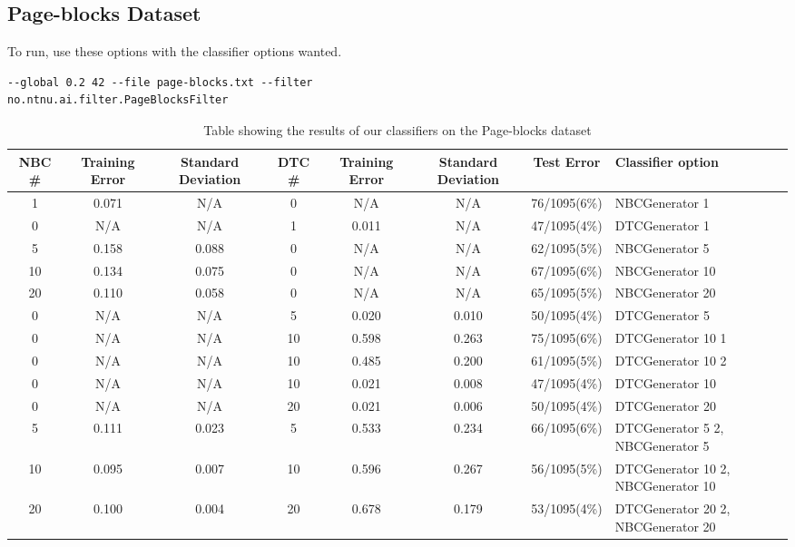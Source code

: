 \subsection{Page-blocks Dataset}\label{pblocks}


To run, use these options with the classifier options wanted.

\begin{lstlisting}[label=lst:pblocks, caption=Page-blocks dataset general 
options]
--global 0.2 42 --file page-blocks.txt --filter 
no.ntnu.ai.filter.PageBlocksFilter
\end{lstlisting}

\begin{landscape}
\begin{table}
\begin{tabular}{|c|c|c||c|c|c||c||p{5cm}|}
\hline
NBC \# & Training Error & Standard Deviation & DTC \# & Training Error
& Standard Deviation & Test Error & Classifier option \\ \hline
1 & 0.071 & N/A & 0 & N/A & N/A & 76/1095(6\%) & NBCGenerator 1 \\ \hline
0 & N/A & N/A & 1 & 0.011 & N/A & 47/1095(4\%) & DTCGenerator 1 \\ \hline
5 & 0.158 & 0.088 & 0 & N/A & N/A & 62/1095(5\%) & NBCGenerator 5 \\ \hline
10 & 0.134 & 0.075 & 0 & N/A & N/A & 67/1095(6\%) & NBCGenerator 10 \\ \hline
20 & 0.110 & 0.058 & 0 & N/A & N/A & 65/1095(5\%) & NBCGenerator 20 \\ \hline
0 & N/A & N/A & 5 & 0.020 & 0.010 & 50/1095(4\%) & DTCGenerator 5 \\ \hline
0 & N/A & N/A & 10 & 0.598 & 0.263 & 75/1095(6\%) & DTCGenerator 10 1 \\ \hline
0 & N/A & N/A & 10 & 0.485 & 0.200 & 61/1095(5\%) & DTCGenerator 10 2 \\ \hline
0 & N/A & N/A & 10 & 0.021 & 0.008 & 47/1095(4\%) & DTCGenerator 10 \\ \hline
0 & N/A & N/A & 20 & 0.021 & 0.006 & 50/1095(4\%) & DTCGenerator 20 \\ \hline
5 & 0.111 & 0.023 & 5 & 0.533 & 0.234 & 66/1095(6\%) & DTCGenerator 5 2, 
\newline NBCGenerator 5 \\ \hline
10 & 0.095 & 0.007 & 10 & 0.596 & 0.267 & 56/1095(5\%) & DTCGenerator 10 2, 
\newline NBCGenerator 10 \\ \hline
20 & 0.100 & 0.004 & 20 & 0.678 & 0.179 & 53/1095(4\%) & DTCGenerator 20 2, 
\newline NBCGenerator 20 \\ \hline
\hline
\end{tabular}
\label{tab:pblocks}
\caption{Table showing the results of our classifiers on the Page-blocks 
dataset}
\end{table}
\end{landscape}
